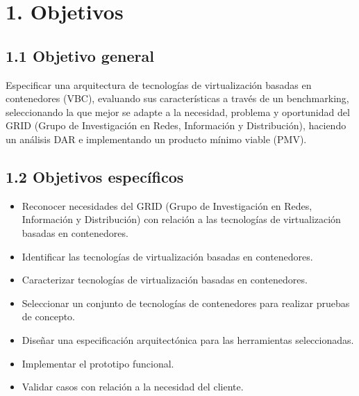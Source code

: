 \section*{1. Objetivos}

\subsection*{1.1 Objetivo general}
Especificar una arquitectura de tecnologías de virtualización basadas en contenedores (VBC), evaluando sus características a través de un benchmarking, seleccionando la que mejor se adapte a la necesidad, problema y oportunidad del GRID (Grupo de Investigación en Redes, Información y Distribución), haciendo un análisis DAR e implementando un producto mínimo viable (PMV).

\subsection*{1.2 Objetivos específicos}
\begin{itemize}
    \item Reconocer necesidades del GRID (Grupo de Investigación en Redes, Información y Distribución) con relación a las tecnologías de virtualización basadas en contenedores.
    \item Identificar las tecnologías de virtualización basadas en contenedores.
    \item Caracterizar tecnologías de virtualización basadas en contenedores.
    \item Seleccionar un conjunto de tecnologías de contenedores para realizar pruebas de concepto.
    \item Diseñar una especificación arquitectónica para las herramientas seleccionadas.
    \item Implementar el prototipo funcional.
    \item Validar casos con relación a la necesidad del cliente.
\end{itemize}